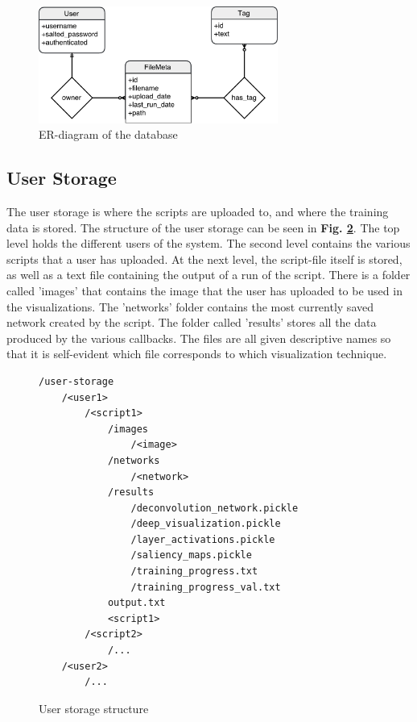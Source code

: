 \begin{figure}[h!]
    \centering
        \includegraphics[width=0.7\textwidth]{fig/database-diagram.pdf}
        \caption{ER-diagram of the database}
        \label{database}
\end{figure}

\subsection{User Storage}

The user storage is where the scripts are uploaded to, and where the training data is stored. The structure of the user storage can be seen in \textbf{Fig. \ref{struct2}}. The top level holds the different users of the system. The second level contains the various scripts that a user has uploaded. At the next level, the script-file itself is stored, as well as a text file containing the output of a run of the script. There is a folder called 'images' that contains the image that the user has uploaded to be used in the visualizations. The 'networks' folder contains the most currently saved network created by the script. The folder called 'results' stores all the data produced by the various callbacks. The files are all given descriptive names so that it is self-evident which file corresponds to which visualization technique.

\begin{figure}[h!]
\begin{verbatim}
/user-storage
    /<user1>
        /<script1>
            /images
                /<image>
            /networks
                /<network>
            /results
                /deconvolution_network.pickle
                /deep_visualization.pickle
                /layer_activations.pickle
                /saliency_maps.pickle
                /training_progress.txt
                /training_progress_val.txt
            output.txt
            <script1>
        /<script2>
            /...
    /<user2>
        /...
\end{verbatim}
\caption{User storage structure}
\label{struct2}
\end{figure}

